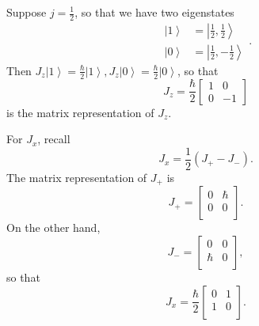 \documentclass[phys334]{subfiles}
\begin{document}
    \begin{example}{}
        Suppose $j=\frac{1}{2}$, so that we have two eigenstates
        \begin{equation*}
            \begin{aligned}
                \left| 1 \right\rangle & = \left| \frac{1}{2},\frac{1}{2} \right\rangle \\
                \left| 0 \right\rangle & = \left| \frac{1}{2},-\frac{1}{2} \right\rangle
            \end{aligned} .
        \end{equation*}
        Then $J_z\left| 1 \right\rangle = \frac{\hbar}{2}\left| 1 \right\rangle, J_z\left| 0 \right\rangle = \frac{\hbar}{2}\left| 0 \right\rangle$, so that
        \begin{equation*}
            J_z = \frac{\hbar}{2} \begin{bmatrix} 1 & 0 \\ 0 & -1 \end{bmatrix}
        \end{equation*}
        is the matrix representation of $J_z$.

        For $J_x$, recall
        \begin{equation*}
            J_x = \frac{1}{2}\left( J_+-J_- \right).
        \end{equation*}
        The matrix representation of $J_+$ is
        \begin{equation*}
            J_+ =
            \begin{bmatrix}
            	0 & \hbar \\
            	0 & 0 \\
            \end{bmatrix}.
        \end{equation*}
        On the other hand,
        \begin{equation*}
            J_- = 
            \begin{bmatrix}
            	0 & 0 \\
            	\hbar & 0 \\
            \end{bmatrix},
        \end{equation*}
        so that
        \begin{equation*}
            J_x = \frac{\hbar}{2} 
            \begin{bmatrix}
            	0 & 1 \\
            	1 & 0 \\
            \end{bmatrix}.
        \end{equation*}


\end{example}
\end{document}
